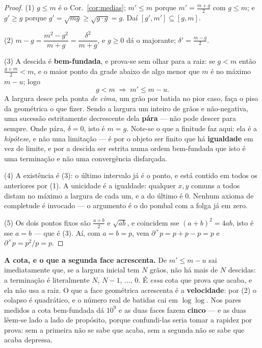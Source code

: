 \documentclass[11pt,a4paper]{article}
\begin{document}
\begin{proof}
(1) $g\le m$ é o Cor.~\ref{cor:medias}; $m'\le m$ porque $m'=\tfrac{m+g}{2}$ com
$g\le m$; e $g'\ge g$ porque $g'=\sqrt{mg}\ge\sqrt{g\cdot g}=g$. Daí
$[g',m']\subseteq[g,m]$.

(2) $m-g=\dfrac{m^{2}-g^{2}}{m+g}=\dfrac{\delta^{2}}{m+g}$, e $g\ge 0$ dá o
majorante; $\delta'=\tfrac{m-g}{2}$.

(3) A descida é \textbf{bem-fundada}, e prova-se sem olhar para a raiz: se
$g<m$ então $\tfrac{g+m}{2}<m$, e o maior ponto da grade abaixo de algo menor que
$m$ é no máximo $m-u$; logo
\[
g<m\;\Longrightarrow\;m'\le m-u .
\]
A largura desce pela ponta \emph{de cima}, um grão por batida no pior caso, faça
o piso da geométrica o que fizer. Sendo a largura um inteiro de grãos e
não-negativa, uma sucessão estritamente decrescente dela \textbf{pára} --- não
pode descer para sempre. Onde pára, $\delta=0$, isto é $m=g$. Note-se o que a
finitude faz aqui: ela é a \emph{hipótese}, e não uma limitação --- é por o
objeto ser finito que há \textbf{igualdade} em vez de limite, e por a descida ser
estrita numa ordem bem-fundada que isto é uma terminação e não uma convergência
disfarçada.

(4) A existência é (3): o último intervalo já é o ponto, e está contido em todos
os anteriores por (1). A unicidade é a igualdade: qualquer $x,y$ comuns a todos
distam no máximo a largura de cada um, e a do último é $0$. Nenhum axioma de
completude é invocado --- o argumento é o do pombal com a folga já em zero.

(5) Os dois pontos fixos são $\tfrac{a+b}{2}$ e $\sqrt{ab}$, e coincidem sse
$(a+b)^{2}=4ab$, isto é sse $a=b$ --- que é (3). Aí, com $a=b=p$, vem
$\partial^{+}p=p+p-p=p$ e $\partial^{\times}p=p^{2}/p=p$.
\end{proof}

\medskip\noindent\textbf{A cota, e o que a segunda face acrescenta.} De
$m'\le m-u$ sai imediatamente que, se a largura inicial tem $N$ grãos, não há
mais de $N$ descidas: a terminação é literalmente $N,\,N-1,\,\ldots,\,0$. É
\emph{essa} cota que prova que acaba, e ela não usa a raiz. O que a face
geométrica acrescenta é a \textbf{velocidade}: por (2) o colapso é quadrático, e
o número real de batidas cai em $\log\log$. Nos pares medidos a cota
bem-fundada dá $10^{9}$ e as duas faces fazem \textbf{cinco} --- e as duas
lêem-se lado a lado de propósito, porque confundi-las seria tomar a rapidez por
prova: sem a primeira não se sabe que acaba, sem a segunda não se sabe que acaba
depressa.
\end{document}
